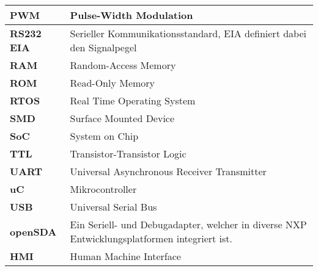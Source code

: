 \begin{table}[H]
\begin{tabular}{|L{3cm}|L{12.5cm}|}
		\hline
		\textbf{PWM} & Pulse-Width Modulation\\
		
		\hline
		\textbf{RS232 EIA} & Serieller Kommunikationsstandard, EIA definiert dabei den Signalpegel\\
		
		\hline
		\textbf{RAM} & Random-Access Memory \\
		
		\hline
		\textbf{ROM} & Read-Only Memory \\
		
		\hline
		\textbf{RTOS} & Real Time Operating System \\
		
		\hline
		\textbf{SMD} &	Surface Mounted Device\\
		
		\hline
		\textbf{SoC} &	System on Chip\\
			
		\hline
		\textbf{TTL} &	Transistor-Transistor Logic\\	
				
		\hline
		\textbf{UART} &	Universal Asynchronous Receiver Transmitter\\
		
		\hline
		\textbf{uC} &	Mikrocontroller\\
		
		\hline
		\textbf{USB} &	Universal Serial Bus\\		
		
		\hline
		\textbf{openSDA} & Ein Seriell- und Debugadapter, welcher in diverse NXP Entwicklungsplatformen integriert ist.\\
		
		\hline
		\textbf{HMI} & Human Machine Interface\\
				
		\hline
	\end{tabular} 
\end{table}


